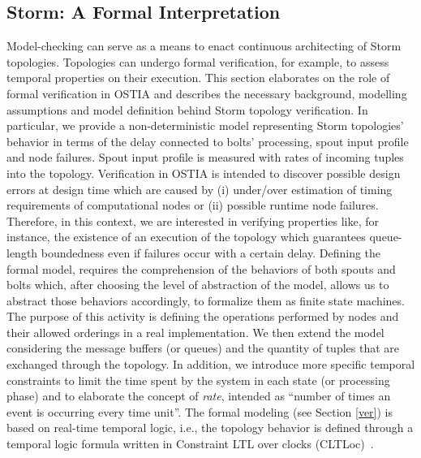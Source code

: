 \subsection{Storm: A Formal Interpretation}
Model-checking can serve as a means to enact continuous architecting of Storm topologies. Topologies can undergo formal verification, for example, to assess temporal properties on their execution.
This section elaborates on the role of formal verification in OSTIA and describes the necessary background, modelling assumptions and model definition behind Storm topology verification.
In particular, we provide a non-deterministic model representing Storm topologies' behavior in terms of the delay connected to bolts' processing, spout input profile and node failures. Spout input profile is measured with rates of incoming tuples into the topology.
Verification in OSTIA is intended to discover possible design errors at design time which are caused by (i) under/over estimation of timing requirements of computational nodes or (ii) possible runtime node failures.
Therefore, in this context, we are interested in verifying properties like, for instance, the existence of an execution of the topology which guarantees queue-length boundedness even if failures occur with a certain delay.
Defining the formal model, requires the comprehension of %
the behaviors of both spouts and bolts which, after choosing the level of abstraction of the model, allows us to abstract those behaviors accordingly, %
to formalize them as finite state machines. The purpose of this  activity is defining the %
operations performed by nodes and their allowed orderings in a real implementation. %
We then extend the model %
considering the message buffers (or queues) and the quantity of tuples that are exchanged through the topology.
In addition, %
we introduce more specific temporal constraints %
to limit the time spent by the system in each state (or processing phase) and to elaborate the concept of \textit{rate}, intended as ``number of times an event is occurring every time unit''.
The formal modeling (see Section \ref{ver}) is based on real-time temporal logic, i.e., the topology behavior is defined through a temporal logic formula written in Constraint LTL over clocks (CLTLoc)~\cite{BRS15}.

